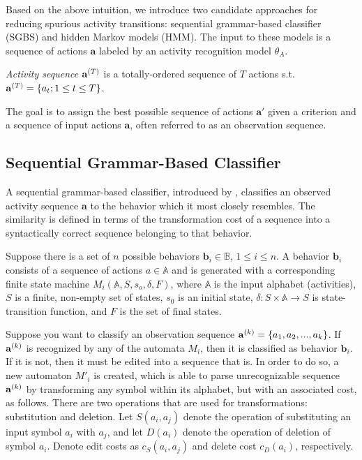 Based on the above intuition, we introduce two candidate approaches for reducing spurious activity transitions: sequential grammar-based classifier (SGBS) and hidden Markov models (HMM).  The input to these models is a sequence of actions $\mathbf{a}$ labeled by an activity recognition model $\theta_A$. 
\begin{definition}
	\emph{Activity sequence} $\mathbf{a}^{\scriptsize(T)}$ is a totally-ordered sequence of $T$ actions s.t. $\mathbf{a}^{\scriptsize(T)}=\{a_t; 1 \leq t \leq T\}$.
\end{definition}
\noindent
The goal is to assign the best possible sequence of actions $\mathbf{a}'$ given a criterion and a sequence of input actions $\mathbf{a}$, often referred to as an observation sequence.


\subsection{Sequential Grammar-Based Classifier}

A sequential grammar-based classifier, introduced by \cite{Goshorn2001}, classifies an observed activity sequence $\mathbf{a}$ to the behavior which it most closely resembles. The similarity is defined in terms of the transformation cost of a sequence into a syntactically correct sequence belonging to that behavior. 

Suppose there is a set of $n$ possible behaviors $\mathbf{b}_i \in \mathbb{B}$, $1 \leq i \leq n$. A behavior $\mathbf{b}_i$ consists of a sequence of actions $a \in \mathbb{A}$ and is generated with a corresponding finite state machine $M_i(\mathbb{A}, S, s_o, \delta, F)$, where $\mathbb{A}$ is the input alphabet (activities), $S$ is a finite, non-empty set of states, $s_0$ is an initial state, $\delta: S \times \mathbb{A} \rightarrow S$ is state-transition function, and $F$ is the set of final states.


Suppose you want to classify an observation sequence $\mathbf{a}^{\scriptsize(k)}=\{a_1, a_2, ..., a_k\}$. If $\mathbf{a}^{\scriptsize(k)}$ is recognized by any of the automata $M_i$, then it is classified as behavior $\mathbf{b}_i$. If it is not, then it must be edited into a sequence that is. In order to do so, a new automaton $M'_i$ is created, which is able to parse unrecognizable sequence $\mathbf{a}^{\scriptsize(k)}$ by transforming any symbol within its alphabet, but with an associated cost, as follows. There are two operations that are used for transformations: substitution and deletion. Let $S(a_i, a_j)$ denote the operation of substituting an input symbol $a_i$ with $a_j$, and let $D(a_i)$ denote the operation of deletion of symbol $a_i$. Denote edit costs as $c_S(a_i, a_j)$ and delete cost $c_D(a_i)$, respectively. 

